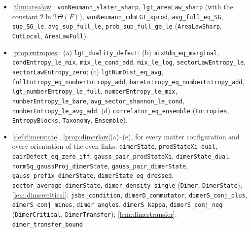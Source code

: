 \begin{itemize}[leftmargin=1.5em,itemsep=1pt]
arbitrary region, with the sign of the identification of \cref{lem:slater}: \texttt{rdmF}, \texttt{vonNeumann\_rdmF\_slater},
\texttt{vonNeumann\_rdmF\_le}, \texttt{lgt\_areaLaw\_bulk} (\texttt{SlaterBulk}); \cref{lem:binent}:
\texttt{binEntropy\_le\_two\_log\_two\_sqrt}, \texttt{binEntropy\_eq\_two\_log\_two\_sqrt\_iff} (\texttt{BinEntropy});
\cref{lem:annealed}: \texttt{annealed\_K}, \texttt{annealed\_cut} (\texttt{AreaLawSharp}), \texttt{annealed\_cut\_Q},
\texttt{annealed\_cut\_Q\_sq}, \texttt{annealed\_ivl\_K}, \texttt{annealed\_ivl\_Q}, \texttt{annealed\_ivl\_Q\_sq}
(\texttt{AnnealedInterval}).
\item \cref{thm:arealaw}: \texttt{vonNeumann\_slater\_sharp}, \texttt{lgt\_areaLaw\_sharp} (with the constant
$2\ln2\,\Theta(F)$), \texttt{vonNeumann\_rdmLGT\_xprod}, \texttt{avg\_full\_eq\_SG}, \texttt{sup\_SG\_le},
\texttt{avg\_sup\_full\_le}, \texttt{prob\_sup\_full\_ge\_le} (\texttt{AreaLawSharp}, \texttt{CutLocal},
\texttt{AreaLawFull}).
\item \cref{prop:entropies}: (a) \texttt{lgt\_duality\_defect}; (b) \texttt{mixRdm\_eq\_marginal},
\texttt{condEntropy\_le\_mix}, \texttt{mix\_le\_cond\_add}, \texttt{mix\_le\_log},
\texttt{sectorLawEntropy\_le}, \texttt{sectorLawEntropy\_zero}; (c) \texttt{lgtNumDist\_eq\_avg},
\texttt{fullEntropy\_eq\_numberEntropy\_add}, \texttt{bareEntropy\_eq\_numberEntropy\_add},
\texttt{lgt\_numberEntropy\_le\_full}, \texttt{numberEntropy\_le\_mix}, \texttt{numberEntropy\_le\_bare},
\texttt{avg\_sector\_shannon\_le\_cond}, \texttt{numberEntropy\_le\_avg\_add}; (d)
\texttt{correlator\_eq\_ensemble} (\texttt{Entropies}, \texttt{EntropyBlocks}, \texttt{Taxonomy},
\texttt{Ensemble}).
\item \cref{def:dimerstate}, \cref{prop:dimerlaw}(a)--(e), for every matter configuration and every orientation of
the even links: \texttt{dimerState}, \texttt{prodStateXi\_dual}, \texttt{pairDefect\_eq\_zero\_iff},
\texttt{gauss\_pair\_prodStateXi}, \texttt{dimerState\_dual}, \texttt{normSq\_gaussProj\_dimerState},
\texttt{gauss\_pair\_dimerState}, \texttt{gauss\_prefix\_dimerState}, \texttt{dimerState\_eq\_dressed},
\texttt{sector\_average\_dimerState}, \texttt{dimer\_density\_single} (\texttt{Dimer}, \texttt{DimerState});
\cref{lem:dimercritical}: \texttt{jsbs\_condition}, \texttt{dimerD\_commutator}, \texttt{dimerS\_conj\_plus},
\texttt{dimerS\_conj\_minus}, \texttt{dimer\_angles}, \texttt{dimerS\_kappa}, \texttt{dimerS\_conj\_neg}
(\texttt{DimerCritical}, \texttt{DimerTransfer}); \cref{lem:dimertransfer}: \texttt{dimer\_transfer\_bound}

\end{itemize}
